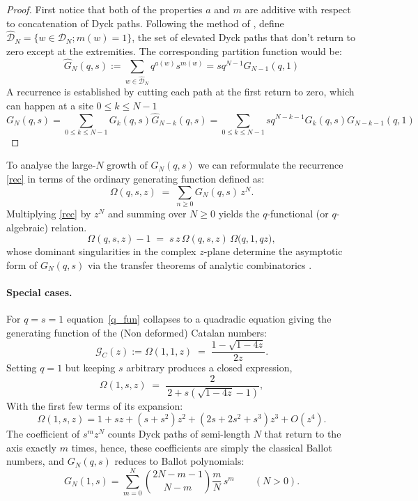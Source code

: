 \documentclass[pdflatex,sn-mathphys-num]{sn-jnl}
\theoremstyle{definition}
\theoremstyle{remark}
\numberwithin{equation}{section}
\begin{document}
\begin{proof}
First notice that both of the properties $a$ and $m$ are additive with respect to concatenation of Dyck paths. Following the method of \cite{deutsch1999dyck}, define $\hat{\mathcal{D}}_N = \{ w \in \mathcal{D}_N; m(w) =1  \}$, the set of elevated Dyck paths that don't return to zero except at the extremities. The corresponding partition function would be:
\begin{equation}
  \hat{G}_N(q,s) := \sum_{w \in \hat{\mathcal{D}}_N} q^{a(w)} s^{m(w)}   = s q^{N-1} G_{N-1}(q,1)   
\end{equation}
A recurrence is established by cutting each path at the first return to zero, which can happen at a site $ 0\leq k\leq N-1$
\begin{equation}
    G_{N}(q,s) = \sum_{0 \leq k \leq N-1} G_{k}(q,s)\hat{G}_{N-k}(q,s) =  \sum_{0 \leq k \leq N-1} s q^{N-k-1} G_{k}(q,s) G_{N-k-1}(q,1)
\end{equation}
\end{proof}
To analyse the large-\(N\) growth of \(G_N(q,s)\) we can reformulate the recurrence
\eqref{rec} in terms of the ordinary generating function defined as:
\begin{equation}
\Omega(q,s,z)\;=\;\sum_{n\ge 0} G_N(q,s)\,z^{N}.
\end{equation}
Multiplying \eqref{rec} by \(z^{N}\) and summing over \(N\ge 0\) yields the
\(q\)-functional (or \(q\)-algebraic) relation.
\begin{equation}\label{q_fun}
  \Omega(q,s,z)-1 \;=\; s\,z\,\Omega(q,s,z)\,\Omega\!\bigl(q,1,qz\bigr),
\end{equation}
whose dominant singularities in the complex \(z\)-plane determine the
asymptotic form of \(G_N(q,s)\) via the transfer theorems of analytic
combinatorics \cite{flajolet2009analytic,barbe2013q,barbe2020q}.

\paragraph*{Special cases.}
For \(q=s=1\) equation~\eqref{q_fun} collapses to a quadradic equation giving the generating function of the (Non deformed) Catalan numbers:
\begin{equation}
    \mathcal{G}_{C}(z) :=
\Omega(1,1,z)\;=\;\frac{1-\sqrt{1-4z}}{2z}.
\label{generating_C}
\end{equation}
Setting \(q=1\) but keeping \(s\) arbitrary produces a closed expression,
\begin{equation}\label{Omega1sx}
\Omega(1,s,z)\;=\;\frac{2}{\,2+s\!\left(\sqrt{1-4z}-1\right)},
\end{equation}
With the first few terms of its expansion:
\[
  \Omega(1,s,z)=1+s z+(s+s^{2})z^{2}+(2s+2s^{2}+s^{3})z^{3}+O(z^4).
\]
The coefficient of \(s^{m}z^{N}\) counts Dyck paths of semi-length \(N\) that
return to the axis exactly \(m\) times, hence, these coefficients are simply the classical Ballot numbers, and $G_N(q,s)$ reduces to Ballot polynomials:
\[
  G_{N}(1,s)=\sum_{m=0}^{N}
             \binom{2N-m-1}{\,N-m\,}\frac{m}{N}\,s^{m}\qquad(N>0).
\]
\end{document}
